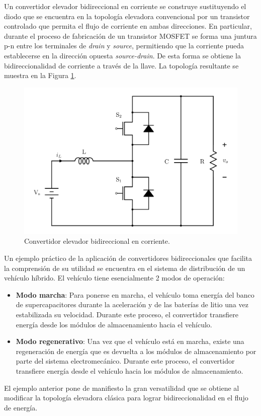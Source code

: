 Un convertidor elevador bidireccional en corriente se construye sustituyendo el diodo que se encuentra en la topología elevadora convencional por un transistor controlado que permita el flujo de corriente en ambas direcciones. En particular, durante el proceso de fabricación de un transistor \mbox{MOSFET} se forma una juntura p-n entre los terminales de \emph{drain} y \emph{source}, permitiendo que la corriente pueda establecerse en la dirección opuesta \emph{source-drain}. De esta forma se obtiene la bidireccionalidad de corriente a través de la llave. La topología resultante se muestra en la Figura \ref{convertidor-bidireccional}.

\begin{figure}[hbt!]
    \centering
    \includegraphics[width=0.40\columnwidth]{Imágenes/Diseño del control/Convertidor bidireccional de corriente.pdf}
    \caption{Convertidor elevador bidireccional en corriente.}
    \label{convertidor-bidireccional}
  \end{figure} 

Un ejemplo práctico de la aplicación de convertidores bidireccionales que facilita la comprensión de su utilidad se encuentra en el sistema de distribución de un vehículo híbrido. El vehículo tiene esencialmente 2 modos de operación:

\begin{itemize}
    \item \textbf{Modo marcha}: Para ponerse en marcha, el vehículo toma energía del banco de supercapacitores durante la aceleración y de las baterías de litio una vez estabilizada su velocidad. Durante este proceso, el convertidor transfiere energía desde los módulos de almacenamiento hacia el vehículo.
    \item \textbf{Modo regenerativo}: Una vez que el vehículo está en marcha, existe una regeneración de energía que es devuelta a los módulos de almacenamiento por parte del sistema electromecánico. Durante este proceso, el convertidor transfiere energía desde el vehículo hacia los módulos de almacenamiento.
\end{itemize}

El ejemplo anterior pone de manifiesto la gran versatilidad que se obtiene al modificar la topología elevadora clásica para lograr bidireccionalidad en el flujo de energía.

